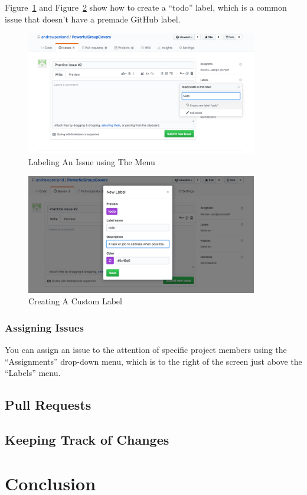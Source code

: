 \documentclass[11pt]{article}
\begin{document}
Figure~\ref{fig:begin-typing-todo} and Figure~\ref{fig:todo-label-details} show how to create a ``todo'' label, which is a common issue that doesn't have a premade GitHub label. 


\begin{figure}\label{fig:begin-typing-todo}
\includegraphics[width=0.9\textwidth]{CreatingLabels}
\caption{Labeling An Issue using The Menu}
\end{figure}

\begin{figure}\label{fig:todo-label-details}
\includegraphics[width=0.9\textwidth]{NewLabelBox}
\caption{Creating A Custom Label}
\end{figure}


\subsubsection{Assigning Issues}

You can assign an issue to the attention of specific project members using the ``Assignments'' drop-down menu, which is to the right of the screen just above the ``Labels'' menu. 

\subsection{Pull Requests}

\subsection{Keeping Track of Changes}

\section{Conclusion}
\end{document}
